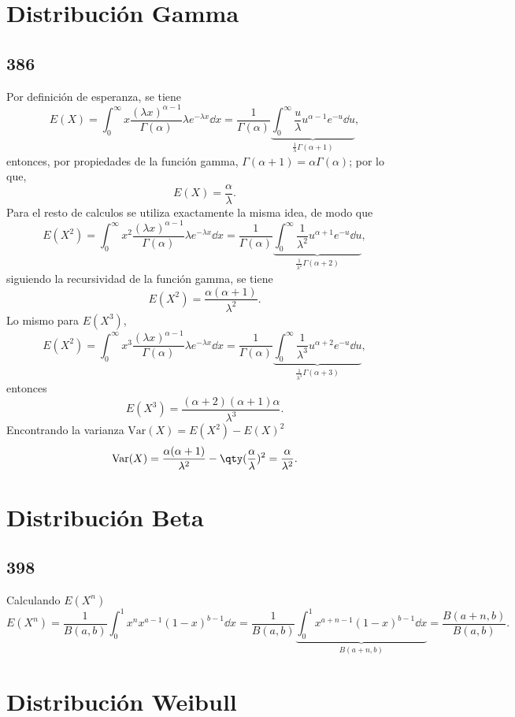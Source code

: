 \section{Distribución Gamma}
\subsection*{386}
Por definición de esperanza, se tiene
	$$E(X) = \int _0 ^\infty x \frac{(\lambda x)^{\alpha - 1}}{\Gamma (\alpha)} \lambda e^{-\lambda x} \dd{x} = \frac{1}{\Gamma (\alpha)} \underbrace{\int _0 ^\infty \frac{u}{\lambda} u^{\alpha - 1} e^{-u} \dd{u}}_{\frac{1}{\lambda} \Gamma (\alpha + 1)},$$
	entonces, por propiedades de la función gamma, $\Gamma (\alpha + 1) = \alpha \Gamma (\alpha)$; por lo que,
	$$E(X) = \frac{\alpha}{\lambda}.$$
Para el resto de calculos se utiliza exactamente la misma idea, de modo que
	$$E(X^2) = \int _0 ^\infty x^2 \frac{(\lambda x)^{\alpha - 1}}{\Gamma (\alpha)} \lambda e^{-\lambda x} \dd{x} = \frac{1}{\Gamma (\alpha)} \underbrace{\int _0 ^\infty \frac{1}{\lambda ^2} u^{\alpha + 1} e^{-u} \dd{u}}_{\frac{1}{\lambda ^2} \Gamma (\alpha + 2)},$$
siguiendo la recursividad de la función gamma, se tiene
	$$E(X^2) = \frac{\alpha (\alpha + 1)}{\lambda ^2}.$$
Lo mismo para $E(X^3)$,
	$$E(X^2) = \int _0 ^\infty x^3 \frac{(\lambda x)^{\alpha - 1}}{\Gamma (\alpha)} \lambda e^{-\lambda x} \dd{x} = \frac{1}{\Gamma (\alpha)} \underbrace{\int _0 ^\infty \frac{1}{\lambda ^3} u^{\alpha + 2} e^{-u} \dd{u}}_{\frac{1}{\lambda ^3} \Gamma (\alpha + 3)},$$
	entonces 
	$$E(X^3) = \frac{(\alpha + 2)(\alpha + 1)\alpha}{\lambda ^3}.$$
Encontrando la varianza $\text{Var} (X) = E(X^2) - E(X)^2$
	$$\text{Var} (X) = \frac{\alpha (\alpha + 1)}{\lambda ^2} - \qty(\frac{\alpha}{\lambda})^2 = \frac{\alpha}{\lambda ^2}.$$


\section{Distribución Beta}
\subsection*{398}
Calculando $E(X^n)$
	$$E(X^n) = \frac{1}{B(a,b)} \int _0 ^1 x^n x^{a - 1} (1 - x)^{b - 1} \dd{x} = \frac{1}{B(a,b)} \underbrace{\int _0 ^1 x^{a + n - 1} (1 - x)^{b - 1} \dd{x}}_{B(a + n,b)} = \frac{B(a + n,b)}{B(a,b)}.$$
	
\section{Distribución Weibull}
